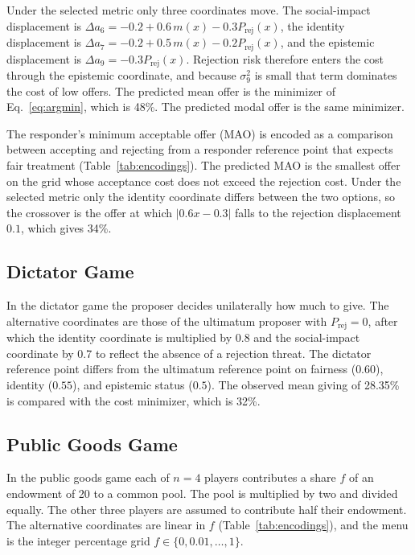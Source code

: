 \documentclass[journal]{IEEEtran}
\begin{document}
Under the selected metric only three coordinates move.
The social-impact displacement is $\Delta a_6 = -0.2+0.6\,m(x)-0.3P_{\text{rej}}(x)$, the identity displacement is $\Delta a_7 = -0.2+0.5\,m(x)-0.2P_{\text{rej}}(x)$, and the epistemic displacement is $\Delta a_9 = -0.3P_{\text{rej}}(x)$.
Rejection risk therefore enters the cost through the epistemic coordinate, and because $\sigma_9^2$ is small that term dominates the cost of low offers.
The predicted mean offer is the minimizer of Eq.~\eqref{eq:argmin}, which is 48\%.
The predicted modal offer is the same minimizer.

The responder's minimum acceptable offer (MAO) is encoded as a comparison between accepting and rejecting from a responder reference point that expects fair treatment (Table~\ref{tab:encodings}).
The predicted MAO is the smallest offer on the grid whose acceptance cost does not exceed the rejection cost.
Under the selected metric only the identity coordinate differs between the two options, so the crossover is the offer at which $|0.6x-0.3|$ falls to the rejection displacement $0.1$, which gives 34\%.

\subsection{Dictator Game}

In the dictator game the proposer decides unilaterally how much to give.
The alternative coordinates are those of the ultimatum proposer with $P_{\text{rej}}=0$, after which the identity coordinate is multiplied by 0.8 and the social-impact coordinate by 0.7 to reflect the absence of a rejection threat.
The dictator reference point differs from the ultimatum reference point on fairness ($0.60$), identity ($0.55$), and epistemic status ($0.5$).
The observed mean giving of 28.35\%~\cite{engel2011} is compared with the cost minimizer, which is 32\%.

\subsection{Public Goods Game}

In the public goods game each of $n=4$ players contributes a share $f$ of an endowment of 20 to a common pool.
The pool is multiplied by two and divided equally.
The other three players are assumed to contribute half their endowment.
The alternative coordinates are linear in $f$ (Table~\ref{tab:encodings}), and the menu is the integer percentage grid $f\in\{0,0.01,\dots,1\}$.
\end{document}
